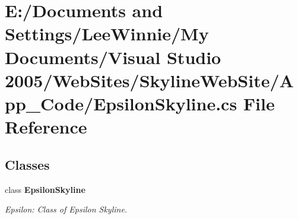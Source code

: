 \section{E:/Documents and Settings/Lee\-Winnie/My Documents/Visual Studio 2005/Web\-Sites/Skyline\-Web\-Site/App\_\-Code/Epsilon\-Skyline.cs File Reference}
\label{_epsilon_skyline_8cs}
\subsection*{Classes}
\begin{CompactItemize}
\item 
class {\bf Epsilon\-Skyline}
\begin{CompactList}\small\item\em Epsilon: Class of Epsilon Skyline. \item\end{CompactList}\end{CompactItemize}
